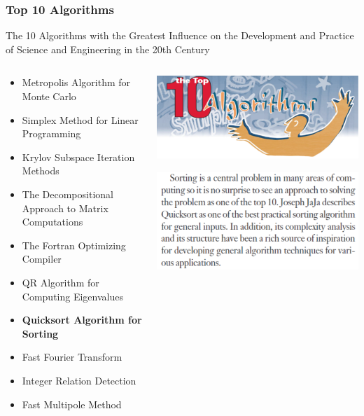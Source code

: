 \documentclass[UTF8,11pt,handout]{beamer}
\begin{document}
\begin{frame}[t]
\frametitle{Top 10 Algorithms}
\begin{block}{The 10 Algorithms with the Greatest Influence on the Development and Practice of Science and Engineering in the 20th Century}
	\begin{columns}
		\begin{column}[T, onlytextwidth]{.55\textwidth}
			\scriptsize{
			\begin{itemize}
				\item Metropolis Algorithm for Monte Carlo
				\item Simplex Method for Linear Programming
				\item Krylov Subspace Iteration Methods
				\item The Decompositional Approach to Matrix Computations
				\item The Fortran Optimizing Compiler
				\item QR Algorithm for Computing Eigenvalues
				\item \small{\textbf{\color{red}Quicksort Algorithm for Sorting}}
				\item Fast Fourier Transform
				\item Integer Relation Detection
				\item Fast Multipole Method				
			\end{itemize}
		}
		\end{column}
		\begin{column}[T, onlytextwidth]{.45\textwidth}
			\begin{center}
				\includegraphics[width=.8\textwidth]{figs/top10.png}
				
				\includegraphics[width=.8\textwidth,height=0.3\textheight]{figs/top10_comments_on_quicksort.png}
			\end{center}
		\end{column}
	\end{columns}
	\begin{center}
	\end{center}
	

\end{block}
\end{frame}
\end{document}
